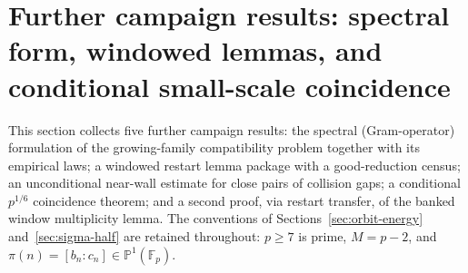 
\section{Further campaign results: spectral form, windowed lemmas, and
conditional small-scale coincidence}
\label{sec:campaign3-round3}

This section collects five further campaign results: the spectral
(Gram-operator) formulation of the growing-family compatibility problem
together with its empirical laws; a windowed restart lemma package with
a good-reduction census; an unconditional near-wall estimate for close
pairs of collision gaps; a conditional $p^{1/6}$ coincidence theorem;
and a second proof, via restart transfer, of the banked window
multiplicity lemma.  The conventions of
Sections~\ref{sec:orbit-energy} and~\ref{sec:sigma-half} are retained
throughout: $p\ge7$ is prime, $M=p-2$, and
$\pi(n)=[b_n:c_n]\in\mathbb P^1(\mathbb F_p)$.


